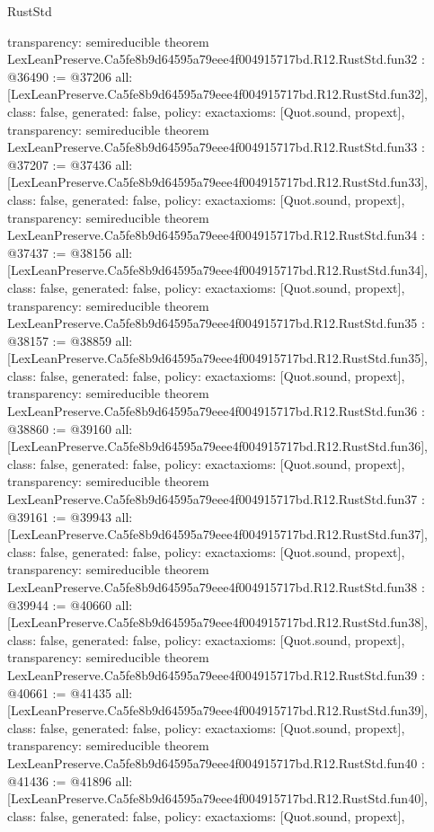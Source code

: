 \begin{lexlean}{RustStd}
\begin{coremodule}
{  transparency: semireducible
}
theorem LexLeanPreserve.Ca5fe8b9d64595a79eee4f004915717bd.R12.RustStd.fun32 : @36490 := @37206 {
  all: [LexLeanPreserve.Ca5fe8b9d64595a79eee4f004915717bd.R12.RustStd.fun32],
  class: false,
  generated: false,
  policy: exact{axioms: [Quot.sound, propext]},
  transparency: semireducible
}
theorem LexLeanPreserve.Ca5fe8b9d64595a79eee4f004915717bd.R12.RustStd.fun33 : @37207 := @37436 {
  all: [LexLeanPreserve.Ca5fe8b9d64595a79eee4f004915717bd.R12.RustStd.fun33],
  class: false,
  generated: false,
  policy: exact{axioms: [Quot.sound, propext]},
  transparency: semireducible
}
theorem LexLeanPreserve.Ca5fe8b9d64595a79eee4f004915717bd.R12.RustStd.fun34 : @37437 := @38156 {
  all: [LexLeanPreserve.Ca5fe8b9d64595a79eee4f004915717bd.R12.RustStd.fun34],
  class: false,
  generated: false,
  policy: exact{axioms: [Quot.sound, propext]},
  transparency: semireducible
}
theorem LexLeanPreserve.Ca5fe8b9d64595a79eee4f004915717bd.R12.RustStd.fun35 : @38157 := @38859 {
  all: [LexLeanPreserve.Ca5fe8b9d64595a79eee4f004915717bd.R12.RustStd.fun35],
  class: false,
  generated: false,
  policy: exact{axioms: [Quot.sound, propext]},
  transparency: semireducible
}
theorem LexLeanPreserve.Ca5fe8b9d64595a79eee4f004915717bd.R12.RustStd.fun36 : @38860 := @39160 {
  all: [LexLeanPreserve.Ca5fe8b9d64595a79eee4f004915717bd.R12.RustStd.fun36],
  class: false,
  generated: false,
  policy: exact{axioms: [Quot.sound, propext]},
  transparency: semireducible
}
theorem LexLeanPreserve.Ca5fe8b9d64595a79eee4f004915717bd.R12.RustStd.fun37 : @39161 := @39943 {
  all: [LexLeanPreserve.Ca5fe8b9d64595a79eee4f004915717bd.R12.RustStd.fun37],
  class: false,
  generated: false,
  policy: exact{axioms: [Quot.sound, propext]},
  transparency: semireducible
}
theorem LexLeanPreserve.Ca5fe8b9d64595a79eee4f004915717bd.R12.RustStd.fun38 : @39944 := @40660 {
  all: [LexLeanPreserve.Ca5fe8b9d64595a79eee4f004915717bd.R12.RustStd.fun38],
  class: false,
  generated: false,
  policy: exact{axioms: [Quot.sound, propext]},
  transparency: semireducible
}
theorem LexLeanPreserve.Ca5fe8b9d64595a79eee4f004915717bd.R12.RustStd.fun39 : @40661 := @41435 {
  all: [LexLeanPreserve.Ca5fe8b9d64595a79eee4f004915717bd.R12.RustStd.fun39],
  class: false,
  generated: false,
  policy: exact{axioms: [Quot.sound, propext]},
  transparency: semireducible
}
theorem LexLeanPreserve.Ca5fe8b9d64595a79eee4f004915717bd.R12.RustStd.fun40 : @41436 := @41896 {
  all: [LexLeanPreserve.Ca5fe8b9d64595a79eee4f004915717bd.R12.RustStd.fun40],
  class: false,
  generated: false,
  policy: exact{axioms: [Quot.sound, propext]},
}
\end{coremodule}
\end{lexlean}
